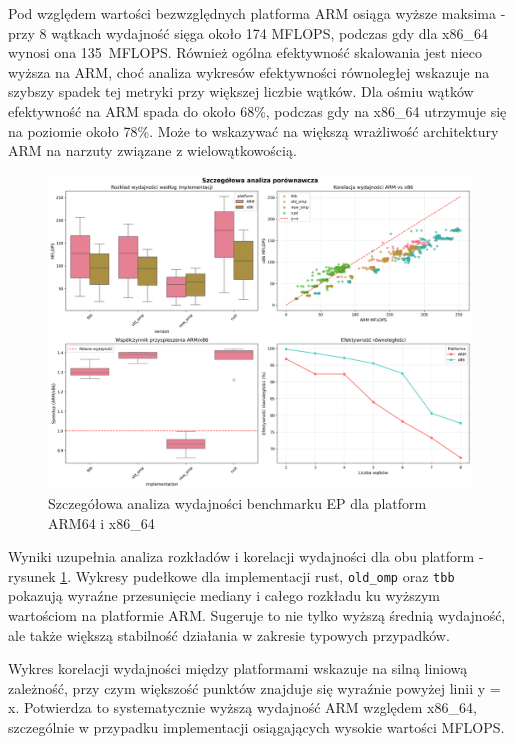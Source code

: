 Pod względem wartości bezwzględnych platforma ARM osiąga wyższe maksima - przy 8 wątkach wydajność sięga około 174 MFLOPS, podczas gdy dla x86\_64 wynosi ona \mbox{135 MFLOPS}. Również ogólna efektywność skalowania jest nieco wyższa na ARM, choć analiza wykresów efektywności równoległej wskazuje na szybszy spadek tej metryki przy większej liczbie wątków. Dla ośmiu wątków efektywność na ARM spada do około 68\%, podczas gdy na x86\_64 utrzymuje się na poziomie około 78\%. Może to wskazywać na większą wrażliwość architektury ARM na narzuty związane z wielowątkowością.
\begin{figure}[H]
    \centering
    \includegraphics[width=\textwidth]{analiza/images/parallel/ep/compare/ep_szczegolowa_analiza_wydajnosci.png}
    \caption{Szczegółowa analiza wydajności benchmarku EP dla platform ARM64 i x86\_64}
    \label{ep_szczegolowa_analiza_wydajnosci}
\end{figure}

Wyniki uzupełnia analiza rozkładów i korelacji wydajności dla obu platform - rysunek \ref{ep_szczegolowa_analiza_wydajnosci}. Wykresy pudełkowe dla implementacji rust, \texttt{old\_omp} oraz \texttt{tbb} pokazują wyraźne przesunięcie mediany i całego rozkładu ku wyższym wartościom na platformie ARM. Sugeruje to nie tylko wyższą średnią wydajność, ale także większą stabilność działania w zakresie typowych przypadków.

Wykres korelacji wydajności między platformami wskazuje na silną liniową zależność, przy czym większość punktów znajduje się wyraźnie powyżej linii y = x. Potwierdza to systematycznie wyższą wydajność ARM względem x86\_64, szczególnie w przypadku implementacji osiągających wysokie wartości MFLOPS.

